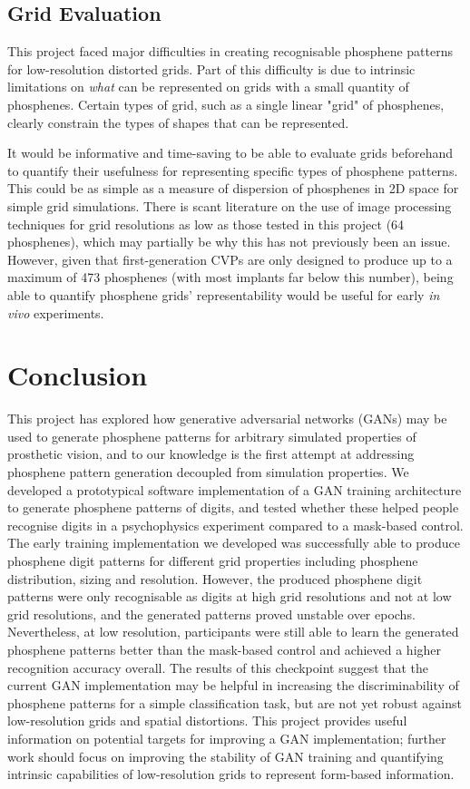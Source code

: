 \documentclass[a4paper,11pt,openany]{book}
\begin{document}
\section*{Grid Evaluation}
\label{sec:org428afa2}

This project faced major difficulties in creating recognisable phosphene patterns for low-resolution distorted grids.
Part of this difficulty is due to intrinsic limitations on \emph{what} can be represented on grids with a small quantity of phosphenes.
Certain types of grid, such as a single linear "grid" of phosphenes, clearly constrain the types of shapes that can be represented.

It would be informative and time-saving to be able to evaluate grids beforehand to quantify their usefulness for representing specific types of phosphene patterns.
This could be as simple as a measure of dispersion of phosphenes in 2D space for simple grid simulations.
There is scant literature on the use of image processing techniques for grid resolutions as low as those tested in this project (64 phosphenes), which may partially be why this has not previously been an issue.
However, given that first-generation CVPs are only designed to produce up to a maximum of 473 phosphenes (with most implants far below this number), being able to quantify phosphene grids' representability would be useful for early \emph{in vivo} experiments.

\chapter{Conclusion}
\label{sec:orgf502389}

This project has explored how generative adversarial networks (GANs) may be used to generate phosphene patterns for arbitrary simulated properties of prosthetic vision, and to our knowledge is the first attempt at addressing phosphene pattern generation decoupled from simulation properties. 
We developed a prototypical software implementation of a GAN training architecture to generate phosphene patterns of digits, and tested whether these helped people recognise digits in a psychophysics experiment compared to a mask-based control.
The early training implementation we developed was successfully able to produce phosphene digit patterns for different grid properties including phosphene distribution, sizing and resolution.
However, the produced phosphene digit patterns were only recognisable as digits at high grid resolutions and not at low grid resolutions, and the generated patterns proved unstable over epochs.
Nevertheless, at low resolution, participants were still able to learn the generated phosphene patterns better than the mask-based control and achieved a higher recognition accuracy overall.
The results of this checkpoint suggest that the current GAN implementation may be helpful in increasing the discriminability of phosphene patterns for a simple classification task, but are not yet robust against low-resolution grids and spatial distortions.
This project provides useful information on potential targets for improving a GAN implementation; further work should focus on improving the stability of GAN training and quantifying intrinsic capabilities of low-resolution grids to represent form-based information.
\end{document}
